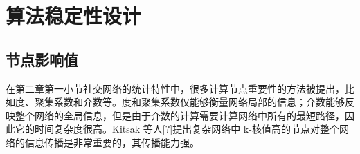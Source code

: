 
\section{算法稳定性设计}
\subsection{节点影响值}
在第二章第一小节社交网络的统计特性中，很多计算节点重要性的方法被提出，比如度、聚集系数和介数等。度和聚集系数仅能够衡量网络局部的信息；介数能够反映整个网络的全局信息，但是由于介数的计算需要计算网络中所有的最短路径，因此它的时间复杂度很高。Kitsak 等人[?]提出复杂网络中 k-核值高的节点对整个网络的信息传播是非常重要的，其传播能力强。

